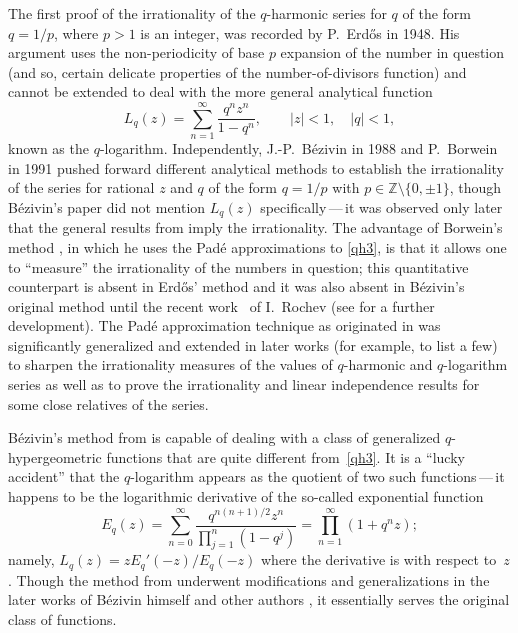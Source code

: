 \documentclass[12pt,reqno]{amsart}
\theoremstyle{remark}
\begin{document}
The first proof of the irrationality of the $q$-harmonic series for $q$ of the form $q=1/p$, where $p>1$ is an integer,
was recorded by P.~Erd\H os \cite{Er48} in 1948. His argument uses the non-periodicity of base $p$ expansion of the number in question
(and so, certain delicate properties of the number-of-divisors function) and cannot be extended to deal with the more general analytical function
\begin{equation}
L_q(z)=\sum_{n=1}^\infty\frac{q^nz^n}{1-q^n}, \qquad |z|<1, \quad |q|<1,
\label{qh3}
\end{equation}
known as the $q$-logarithm. Independently, J.-P.~B\'ezivin \cite{Be88} in 1988 and P.~Borwein \cite{Bo91} in 1991 pushed forward different analytical methods
to establish the irrationality of the series for rational $z$ and $q$ of the form $q=1/p$ with $p\in\mathbb Z\setminus\{0,\pm1\}$, though B\'ezivin's paper
did not mention $L_q(z)$ specifically\,---\,it was observed only later \cite{BV94} that the general results from \cite{Be88} imply the irrationality.
The advantage of Borwein's method \cite{Bo91,Bo92}, in which he uses the Pad\'e approximations to \eqref{qh3}, is that it allows one to ``measure''
the irrationality of the numbers in question; this quantitative counterpart is absent in Erd\H os' method \cite{Er48} and it was also absent
in B\'ezivin's original method \cite{Be88,Be90} until the recent work~\cite{Ro11} of I.~Rochev (see \cite{RV13} for a further development).
The Pad\'e approximation technique as originated in \cite{Bo91,Bo92} was significantly generalized and extended in later works (for example,
\cite{AZ98,BV94,BV05,BV09,BZ07,BZ08,Du96,KRZ06,Ma08,MVZ06,SvA09,Zu02a,Zu04,Zu06} to list a few) to sharpen the irrationality measures of the values
of $q$-harmonic and $q$-logarithm series as well as to prove the irrationality and linear independence results for some close relatives of the series.

B\'ezivin's method from \cite{Be88,Be90} is capable of dealing with a class of generalized $q$-hypergeometric functions that are quite different from~\eqref{qh3}.
It is a ``lucky accident'' that the $q$-logarithm appears as the quotient of two such functions\,---\,it happens to be the logarithmic derivative
of the so-called exponential function
$$
E_q(z)=\sum_{n=0}^\infty\frac{q^{n(n+1)/2}z^n}{\prod_{j=1}^n(1-q^j)}
=\prod_{n=1}^\infty(1+q^nz);
$$
namely, $L_q(z)=zE_q'(-z)/E_q(-z)$ where the derivative is with respect to~$z$. Though the method from \cite{Be88,Be90} underwent modifications and
generalizations in the later works of B\'ezivin himself and other authors \cite{Be98,Be09,Ch01,KRVZ09,Ro11,RV13}, it essentially serves the original class of functions.
\end{document}
